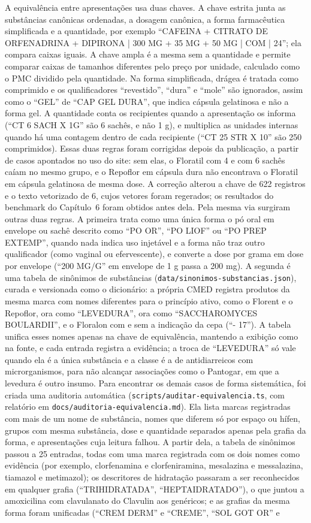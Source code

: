 \documentclass[12pt,oneside,a4paper,english,brazil]{abntex2}
\newcommand{\campo}[1]{\texttt{#1}}
\begin{document}
A equivalência entre apresentações usa duas chaves. A chave estrita junta as substâncias canônicas ordenadas, a dosagem canônica, a forma farmacêutica simplificada e a quantidade, por exemplo ``CAFEINA + CITRATO DE ORFENADRINA + DIPIRONA | 300 MG + 35 MG + 50 MG | COM | 24''; ela compara caixas iguais. A chave ampla é a mesma sem a quantidade e permite comparar caixas de tamanhos diferentes pelo preço por unidade, calculado como o PMC dividido pela quantidade. Na forma simplificada, drágea é tratada como comprimido e os qualificadores ``revestido'', ``dura'' e ``mole'' são ignorados, assim como o ``GEL'' de ``CAP GEL DURA'', que indica cápsula gelatinosa e não a forma gel. A quantidade conta os recipientes quando a apresentação os informa (``CT 6 SACH X 1G'' são 6 sachês, e não 1 g), e multiplica as unidades internas quando há uma contagem dentro de cada recipiente (``CT 25 STR X 10'' são 250 comprimidos). Essas duas regras foram corrigidas depois da publicação, a partir de casos apontados no uso do site: sem elas, o Floratil com 4 e com 6 sachês caíam no mesmo grupo, e o Repoflor em cápsula dura não encontrava o Floratil em cápsula gelatinosa de mesma dose. A correção alterou a chave de 622 registros e o texto vetorizado de 6, cujos vetores foram regerados; os resultados do benchmark do Capítulo~6 foram obtidos antes dela. Pela mesma via surgiram outras duas regras. A primeira trata como uma única forma o pó oral em envelope ou sachê descrito como ``PO OR'', ``PO LIOF'' ou ``PO PREP EXTEMP'', quando nada indica uso injetável e a forma não traz outro qualificador (como vaginal ou efervescente), e converte a dose por grama em dose por envelope (``200 MG/G'' em envelope de 1 g passa a 200 mg). A segunda é uma tabela de sinônimos de substâncias (\campo{data/sinonimos-substancias.json}), curada e versionada como o dicionário: a própria CMED registra produtos da mesma marca com nomes diferentes para o princípio ativo, como o Florent e o Repoflor, ora como ``LEVEDURA'', ora como ``SACCHAROMYCES BOULARDII'', e o Floralon com e sem a indicação da cepa (``- 17''). A tabela unifica esses nomes apenas na chave de equivalência, mantendo a exibição como na fonte, e cada entrada registra a evidência; a troca de ``LEVEDURA'' só vale quando ela é a única substância e a classe é a de antidiarreicos com microrganismos, para não alcançar associações como o Pantogar, em que a levedura é outro insumo. Para encontrar os demais casos de forma sistemática, foi criada uma auditoria automática (\campo{scripts/auditar-equivalencia.ts}, com relatório em \campo{docs/auditoria-equivalencia.md}). Ela lista marcas registradas com mais de um nome de substância, nomes que diferem só por espaço ou hífen, grupos com mesma substância, dose e quantidade separados apenas pela grafia da forma, e apresentações cuja leitura falhou. A partir dela, a tabela de sinônimos passou a 25 entradas, todas com uma marca registrada com os dois nomes como evidência (por exemplo, clorfenamina e clorfeniramina, mesalazina e messalazina, tiamazol e metimazol); os descritores de hidratação passaram a ser reconhecidos em qualquer grafia (``TRIHIDRATADA'', ``HEPTAIDRATADO''), o que juntou a amoxicilina com clavulanato do Clavulin aos genéricos; e as grafias da mesma forma foram unificadas (``CREM DERM'' e ``CREME'', ``SOL GOT OR'' e 
\end{document}

